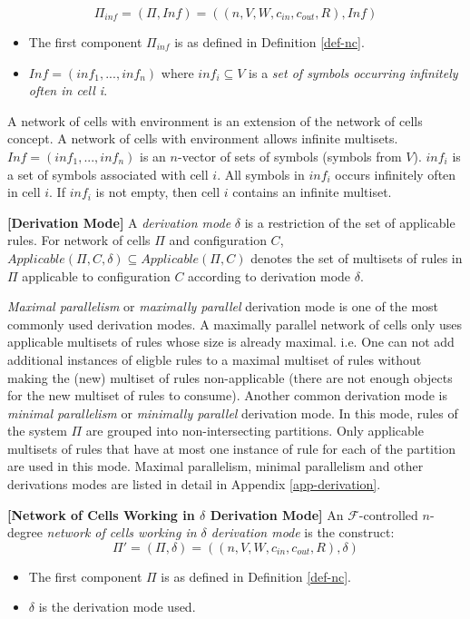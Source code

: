 \documentclass[a4paper]{article}
\theoremstyle{definition}
\begin{document}
$$\Pi_{inf} = (\Pi,Inf) = ((n,V,W,c_{in},c_{out},R), Inf)$$
\begin{itemize}
\item The first component $\Pi_{inf}$ is as defined in Definition \ref{def-nc}.
\item $Inf = (inf_1,...,inf_n)$ where $inf_i \subseteq V$ is a \emph{set of symbols occurring 
infinitely often in cell i}.
\end{itemize}

A network of cells with environment is an extension of the network of cells concept. A network of
cells with environment allows infinite multisets. $Inf=(inf_1,...,inf_n)$ is an $n$-vector of sets 
of symbols (symbols from $V$). $inf_i$ is a set of symbols associated with cell $i$. All symbols in 
$inf_i$ occurs infinitely often in cell $i$. If $inf_i$ is not empty, then cell $i$ contains an
infinite multiset. 


\label{def-derv} \textbf{[Derivation Mode]} A \emph{derivation mode} $\delta$ is a
restriction of the set of applicable rules. For network of cells $\Pi$ and configuration $C$, 
$Applicable(\Pi, C, \delta) \subseteq Applicable(\Pi, C)$ denotes the set of multisets of
rules in $\Pi$ applicable to configuration $C$ according to derivation mode $\delta$. 

\emph{Maximal parallelism} or \emph{maximally parallel} derivation mode is one of the most commonly
used derivation modes. A maximally parallel network of cells only uses applicable multisets of rules
whose size is already maximal. i.e. One can not add additional instances of eligble rules to a
maximal multiset of rules without making the (new) multiset of rules non-applicable (there are not 
enough objects for the new multiset of rules to consume). Another common derivation mode is 
\emph{minimal parallelism} or \emph{minimally parallel} derivation mode. In this mode, rules of the 
system $\Pi$ are grouped into non-intersecting partitions. Only applicable multisets of rules that 
have at most one instance of rule for each of the partition are used in this mode. Maximal 
parallelism, minimal parallelism and other derivations modes are listed in detail in Appendix 
\ref{app-derivation}.


\label{def-nc3}\textbf{[Network of Cells Working in $\delta$ Derivation Mode]} An
$\mathscr{F}$-controlled $n$-degree \emph{network of cells working in $\delta$ derivation mode} is 
the construct: $$\Pi' = (\Pi,\delta) = ((n,V,W,c_{in},c_{out},R), \delta)$$
\begin{itemize}
\item The first component $\Pi$ is as defined in Definition \ref{def-nc}.
\item $\delta$ is the derivation mode used.
\end{itemize}
\end{document}
